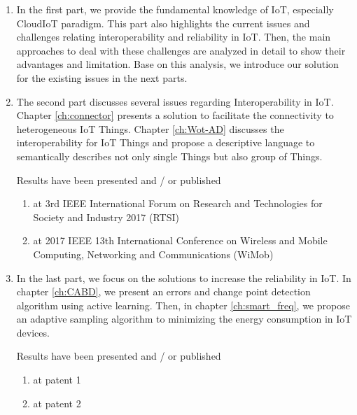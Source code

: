 \begin{enumerate}
\item In the first part, we provide the fundamental knowledge of IoT, especially CloudIoT paradigm. This part also highlights the current issues and challenges relating interoperability and reliability in IoT. Then, the main approaches to deal with these challenges are analyzed in detail to show their advantages and limitation. Base on this analysis, we introduce our solution for the existing issues in the next parts. 

\item The second part discusses several issues regarding Interoperability in IoT. Chapter \ref{ch:connector} presents a solution to facilitate the connectivity to heterogeneous IoT Things. Chapter \ref{ch:Wot-AD} discusses the interoperability for IoT Things and propose a  descriptive language to semantically describes not only single Things but also group of Things.

Results have been presented and / or published
\begin{enumerate}
\item at 3rd IEEE International Forum on Research and Technologies for Society and Industry 2017 (RTSI)~\cite{kim2017industrial}
\item  at 2017 IEEE 13th International Conference on Wireless and Mobile Computing, Networking and Communications (WiMob)~\cite{kim2017scalable}
\end{enumerate}

\item In the last part, we focus on the solutions to increase the reliability in IoT. In chapter \ref{ch:CABD}, we present an errors and change point detection algorithm using active learning. Then, in chapter \ref{ch:smart_freq}, we propose an adaptive sampling algorithm to minimizing the energy consumption in IoT devices.

Results have been presented and / or published
\begin{enumerate}
\item at patent 1
\item  at patent 2
\end{enumerate}

\end{enumerate}
